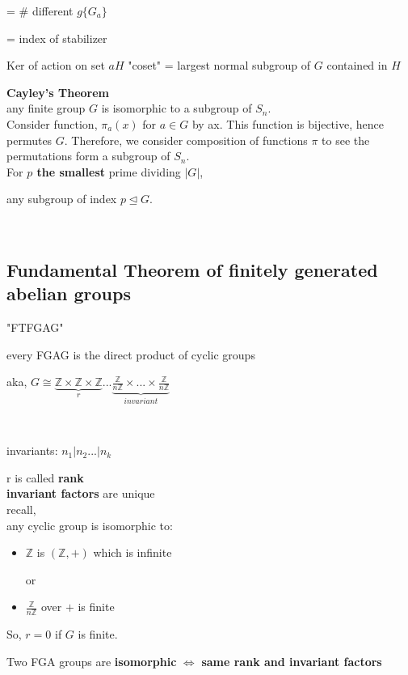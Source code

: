 \documentclass[12pt]{article}
\begin{document}
\centerline{ = # different $g \{G_a\}$ }
\medskip
\centerline{= index of stabilizer}

Ker of action on set $aH$ "coset" = largest normal subgroup of $G$ contained in $H$

\textbf{Cayley's Theorem}\\
any finite group $G$ is isomorphic to a subgroup of $S_n$.\\
\textcolor[gray]{0.5}{Consider function, $\pi_a(x)$ for $a \in G$ by ax. This function is bijective, hence permutes $G$. Therefore, we consider composition of functions $\pi$ to see the permutations form a subgroup of $S_n$.}\\


For \textbf{$p$ the smallest} prime dividing $|G|$,\\ 
\centerline{any subgroup of index $p \trianglelefteq G$.}
\ \\

\subsection*{Fundamental Theorem of finitely generated abelian groups}
"FTFGAG"

\centerline{every FGAG is the direct product of cyclic groups}
\bigskip
\centerline{\indent aka, $\displaystyle G \cong \underbrace{\mathbb{Z} \times \mathbb{Z} \times \mathbb{Z}}_r...\underbrace{\frac{\mathbb{Z}}{n\mathbb{Z}} \times ...\times \frac{\mathbb{Z}}{n\mathbb{Z}}}_{invariant}$}\\
\medskip
\centerline{invariants: $n_1 | n_2...| n_k$}
\bigskip

r is called \textbf{rank}\\
\indent \textbf{invariant factors} are unique\\

recall,\\ 
any cyclic group is isomorphic to:\\
\begin{itemize}
\item $\mathbb{Z}$ is $(\mathbb{Z}, +)$ which is infinite\\
 \centerline{or}
\item $\displaystyle \frac{\mathbb{Z}}{n\mathbb{Z}}$ over $+$ is finite\\
\end{itemize}

\noindent So, $r=0$ if $G$ is finite.
\bigskip

\noindent Two FGA groups are \textbf{isomorphic} $\iff$ \textbf{same rank and invariant factors}\\
\end{document}
